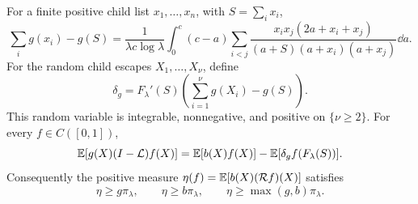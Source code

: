 \begin{lemma}\label{lem:entropy-response}
For a finite positive child list $x_1,\ldots,x_n$, with $S=\sum_i x_i$,
\begin{equation}\label{eq:entropy-pair}
 \sum_i g(x_i)-g(S)
 =\frac1{\lambda c\log\lambda}\int_0^c(c-a)
 \sum_{i<j}\frac{x_ix_j(2a+x_i+x_j)}
 {(a+S)(a+x_i)(a+x_j)}\dd a.
\end{equation}
For the random child escapes $X_1,\ldots,X_\nu$, define
\[
 \delta_g=F_\lambda'(S)\left(\sum_{i=1}^{\nu}g(X_i)-g(S)\right).
\]
This random variable is integrable, nonnegative, and positive on $\{\nu\ge2\}$. For every $f\in C([0,1])$,
\begin{equation}\label{eq:entropy-stationarity}
 \mathbb E[g(X)(I-\mathcal L)f(X)]
 =\mathbb E[b(X)f(X)]-\mathbb E[\delta_g f(F_\lambda(S))].
\end{equation}
Consequently the positive measure $\eta(f)=\mathbb E[b(X)(\mathcal Rf)(X)]$ satisfies
\begin{equation}\label{eq:response-lower-measures}
 \eta\ge g\pi_\lambda,\qquad \eta\ge b\pi_\lambda,
 \qquad \eta\ge\max(g,b)\pi_\lambda.
\end{equation}
\end{lemma}
